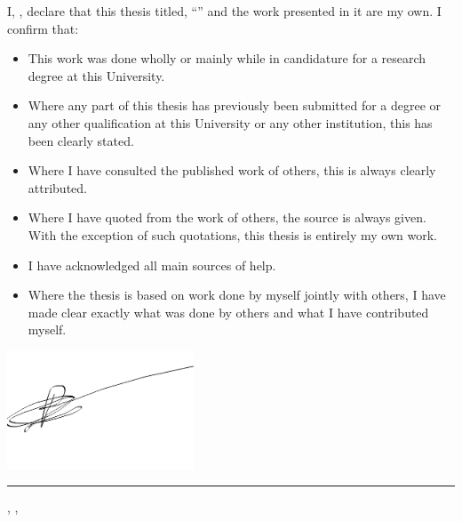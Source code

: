 \noindent I,  {\myFirstName} {\myLastName}, declare that this thesis titled, \enquote{\myTitle} and the work presented in it are my own. I confirm that:

\begin{itemize} 
\item This work was done wholly or mainly while in candidature for a research degree at this University.
\item Where any part of this thesis has previously been submitted for a degree or any other qualification at this University or any other institution, this has been clearly stated.
\item Where I have consulted the published work of others, this is always clearly attributed.
\item Where I have quoted from the work of others, the source is always given. With the exception of such quotations, this thesis is entirely my own work.
\item I have acknowledged all main sources of help.
\item Where the thesis is based on work done by myself jointly with others, I have made clear exactly what was done by others and what I have contributed myself.\\
\end{itemize}


\noindent\hspace{0.5em}\includegraphics[width=15em]{figures/Sign.png}\\
\noindent\rule[1em]{16.5em}{0.5pt}

\vspace{-1.5em}
\noindent {\myFirstName} {\myLastName} \hspace{12em} {\mySubmissionDay}, {\mySubmissionMonth}, {\mySubmissionYear}
